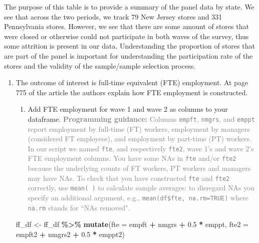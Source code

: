 \documentclass[
]{article}
\newenvironment{Shaded}{\begin{snugshade}}{\end{snugshade}}
\newcommand{\AttributeTok}[1]{\textcolor[rgb]{0.13,0.29,0.53}{#1}}
\newcommand{\FloatTok}[1]{\textcolor[rgb]{0.00,0.00,0.81}{#1}}
\newcommand{\FunctionTok}[1]{\textcolor[rgb]{0.13,0.29,0.53}{\textbf{#1}}}
\newcommand{\NormalTok}[1]{#1}
\newcommand{\OtherTok}[1]{\textcolor[rgb]{0.56,0.35,0.01}{#1}}
\newcommand{\SpecialCharTok}[1]{\textcolor[rgb]{0.81,0.36,0.00}{\textbf{#1}}}
\providecommand{\tightlist}{%
  \setlength{\itemsep}{0pt}\setlength{\parskip}{0pt}}
\begin{document}
The purpose of this table is to provide a summary of the panel data by
state. We see that across the two periods, we track 79 New Jersey stores
and 331 Pennsylvania stores. However, we see that there are some amount
of stores that were closed or otherwise could not participate in both
waves of the survey, thus some attrition is present in our data.
Understanding the proportion of stores that are part of the panel is
important for understanding the participation rate of the stores and the
validity of the sample/sample selection process.

\begin{enumerate}
\def\labelenumi{\arabic{enumi}.}
\setcounter{enumi}{11}
\item
  The outcome of interest is full-time equivalent (FTE) employment. At
  page 775 of the article the authors explain how FTE employment is
  constructed.

  \begin{enumerate}
  \def\labelenumii{\alph{enumii}.}
  \tightlist
  \item
    Add FTE employment for wave 1 and wave 2 as columns to your
    dataframe.
    \textcolor{gray}{\textbf{Programming guidance:} Columns \texttt{empft}, \texttt{nmgrs}, and \texttt{emppt} report employment by full-time (FT) workers, employment by managers (considered FT employees), and employment by part-time (PT) workers. In our script we named \texttt{fte}, and respectively \texttt{fte2}, wave 1's and wave 2's FTE employment columns. You have some NAs in \texttt{fte} and/or \texttt{fte2} because the underlying counts of FT workers, PT workers and managers may have NAs. To check that you have constructed \texttt{fte} and \texttt{fte2} correctly, use \texttt{mean( )} to calculate sample averages: to disregard NAs you specify an additional argument, e.g., \texttt{mean(df\$fte, na.rm=TRUE)} where \texttt{na.rm} stands for ``NAs removed".}
  \end{enumerate}

\begin{Shaded}
\begin{Highlighting}[]
\NormalTok{ff\_df }\OtherTok{\textless{}{-}}\NormalTok{ ff\_df }\SpecialCharTok{\%\textgreater{}\%} \FunctionTok{mutate}\NormalTok{(}\AttributeTok{fte =}\NormalTok{ empft }\SpecialCharTok{+}\NormalTok{ nmgrs }\SpecialCharTok{+} \FloatTok{0.5} \SpecialCharTok{*}\NormalTok{ emppt,}
                          \AttributeTok{fte2 =}\NormalTok{ empft2 }\SpecialCharTok{+}\NormalTok{ nmgrs2 }\SpecialCharTok{+} \FloatTok{0.5} \SpecialCharTok{*}\NormalTok{ emppt2)}
\end{Highlighting}
\end{Shaded}


\end{enumerate}
\end{document}
